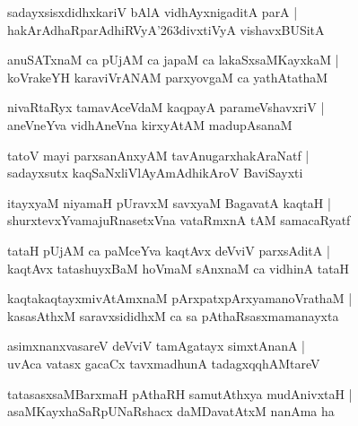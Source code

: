 \documentclass[twoside,12pt,openright]{book}
\def\S{\char'263}
\newcounter{shloka}[chapter]
\begin{document}
\begin{shloka}%
sadayxsisxdidhxkariV bAlA vidhAyxnigaditA parA |\\
hakArAdhaRparAdhiRVyA\S divxtiVyA vishavxBUSitA
\end{shloka}

\begin{shloka}%
anuSATxnaM ca pUjAM ca japaM ca lakaSxsaMKayxkaM |\\
koVrakeYH karaviVrANAM parxyovgaM ca yathAtathaM 
\end{shloka}

\begin{shloka}%
nivaRtaRyx tamavAceVdaM kaqpayA parameVshavxriV |\\
aneVneYva vidhAneVna kirxyAtAM madupAsanaM 
\end{shloka}

\begin{shloka}%
tatoV mayi parxsanAnxyAM tavAnugarxhakAraNatf |\\
sadayxsutx kaqSaNxliVlAyAmAdhikAroV BaviSayxti
\end{shloka}

\begin{shloka}%
itayxyaM niyamaH pUravxM savxyaM BagavatA kaqtaH |\\
shurxtevxYvamajuRnasetxVna vataRmxnA tAM samacaRyatf 
\end{shloka}

\begin{shloka}%
tataH pUjAM ca paMceYva kaqtAvx deVviV parxsAditA |\\
kaqtAvx tatashuyxBaM hoVmaM sAnxnaM ca vidhinA tataH 
\end{shloka}

\begin{shloka}%
kaqtakaqtayxmivAtAmxnaM pArxpatxpArxyamanoVrathaM |\\
kasasAthxM saravxsididhxM ca sa pAthaRsasxmamanayxta
\end{shloka}

\begin{shloka}%
asimxnanxvasareV deVviV tamAgatayx simxtAnanA |\\
uvAca vatasx gacaCx tavxmadhunA tadagxqqhAMtareV 
\end{shloka}

\begin{shloka}%
tatasasxsaMBarxmaH pAthaRH samutAthxya mudAnivxtaH |\\
asaMKayxhaSaRpUNaRshacx daMDavatAtxM nanAma ha 
\end{shloka}
\end{document}
